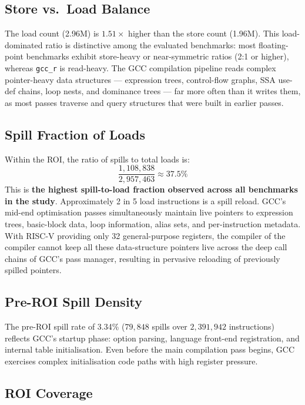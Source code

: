 \documentclass[conference]{IEEEtran}
\begin{document}
\subsection{Store vs.\ Load Balance}

The load count (2.96M) is $1.51\times$ higher than the store count
(1.96M). This load-dominated ratio is distinctive among the evaluated
benchmarks: most floating-point benchmarks exhibit store-heavy or
near-symmetric ratios (2:1 or higher), whereas \texttt{gcc\_r}
is read-heavy. The GCC compilation pipeline reads complex pointer-heavy
data structures --- expression trees, control-flow graphs, SSA use-def
chains, loop nests, and dominance trees --- far more often than it
writes them, as most passes traverse and query structures that were
built in earlier passes.

\subsection{Spill Fraction of Loads}

Within the ROI, the ratio of spills to total loads is:
\[
\frac{1{,}108{,}838}{2{,}957{,}463} \approx 37.5\%
\]
This is \textbf{the highest spill-to-load fraction observed across all
benchmarks in the study}. Approximately 2 in 5 load instructions is a
spill reload. GCC's mid-end optimisation passes simultaneously maintain
live pointers to expression trees, basic-block data, loop information,
alias sets, and per-instruction metadata. With RISC-V providing only
32 general-purpose registers, the compiler of the compiler cannot keep
all these data-structure pointers live across the deep call chains of
GCC's pass manager, resulting in pervasive reloading of previously
spilled pointers.

\subsection{Pre-ROI Spill Density}

The pre-ROI spill rate of 3.34\% ($79{,}848$ spills over
$2{,}391{,}942$ instructions) reflects GCC's startup phase: option
parsing, language front-end registration, and internal table
initialisation. Even before the main compilation pass begins, GCC
exercises complex initialisation code paths with high register pressure.

\subsection{ROI Coverage}
\end{document}

